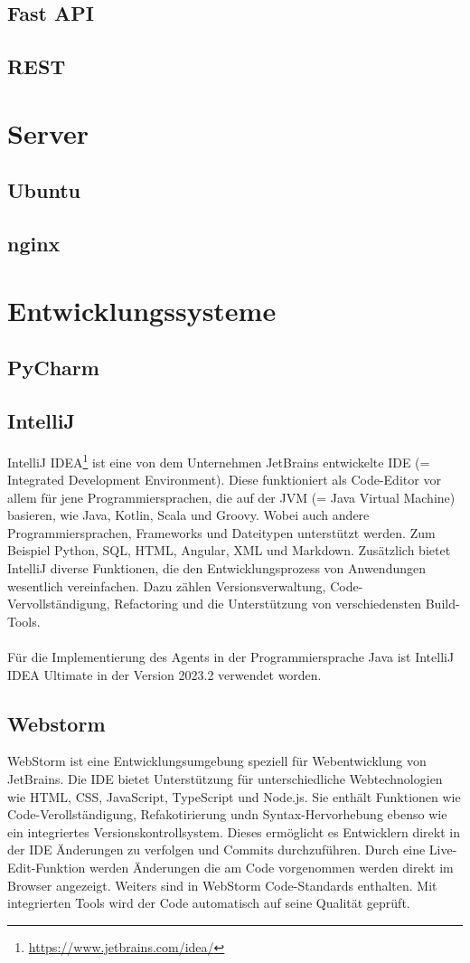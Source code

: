 \documentclass{report}
\begin{document}
\subsection{Fast API}
\subsection{REST}

\section{Server}
\subsection{Ubuntu}
\subsection{nginx}

\section{Entwicklungssysteme}
\subsection{PyCharm}
\subsection{IntelliJ }
IntelliJ IDEA\footnote{\url{https://www.jetbrains.com/idea/}} ist eine von dem Unternehmen JetBrains entwickelte IDE (= Integrated Development Environment). Diese funktioniert als Code-Editor vor allem für jene Programmiersprachen, die auf der JVM (= Java Virtual Machine) basieren, wie Java, Kotlin, Scala und Groovy. Wobei auch andere Programmiersprachen, Frameworks und Dateitypen unterstützt werden. Zum Beispiel Python, SQL, HTML, Angular, XML und Markdown. Zusätzlich bietet IntelliJ diverse Funktionen, die den Entwicklungsprozess von Anwendungen wesentlich vereinfachen. Dazu zählen Versionsverwaltung, Code-Vervollständigung, Refactoring und die Unterstützung von verschiedensten Build-Tools.\\\\
Für die Implementierung des Agents in der Programmiersprache Java ist IntelliJ IDEA Ultimate in der Version 2023.2 verwendet worden.
\subsection{Webstorm}
WebStorm ist eine Entwicklungsumgebung speziell für Webentwicklung von JetBrains. Die IDE bietet Unterstützung für unterschiedliche Webtechnologien wie HTML, CSS, JavaScript, TypeScript und Node.js. Sie enthält Funktionen wie Code-Verollständigung, Refakotirierung undn Syntax-Hervorhebung ebenso wie ein integriertes Versionskontrollsystem. Dieses ermöglicht es Entwicklern direkt in der IDE Änderungen zu verfolgen und Commits durchzuführen. Durch eine Live-Edit-Funktion werden Änderungen die am Code vorgenommen werden direkt im Browser angezeigt. Weiters sind in WebStorm Code-Standards enthalten. Mit integrierten Tools wird der Code automatisch auf seine Qualität geprüft.
\end{document}
